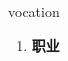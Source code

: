 
\begin{frame}
{\huge vocation}
\begin{center}
\begin{enumerate}\Large
  \item \textbf{职业}
\end{enumerate}
\end{center}
\end{frame}

